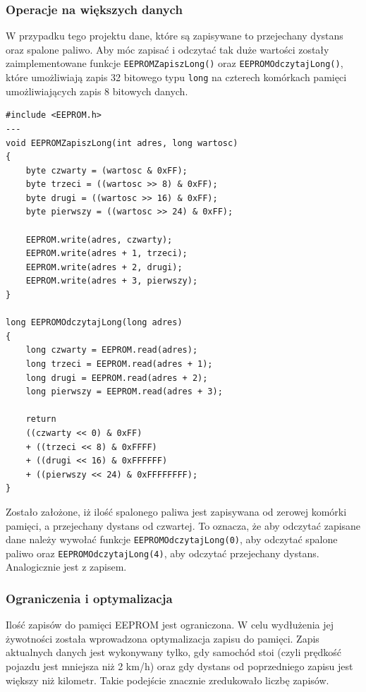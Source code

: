 \subsubsection{Operacje na większych danych}
W przypadku tego projektu dane, które są zapisywane to przejechany dystans oraz spalone paliwo. Aby móc zapisać i odczytać tak duże wartości zostały zaimplementowane funkcje \texttt{EEPROMZapiszLong()} oraz \texttt{EEPROMOdczytajLong()}, które umożliwiają zapis 32 bitowego typu \texttt{long} na czterech komórkach pamięci umożliwiających zapis 8 bitowych danych.

\begin{lstlisting}[label=list:eeprom_long,caption=Zapis i odczyt dużych liczb do/z EEPROM,
basicstyle=\footnotesize\ttfamily]
#include <EEPROM.h>
---
void EEPROMZapiszLong(int adres, long wartosc)
{
    byte czwarty = (wartosc & 0xFF);
    byte trzeci = ((wartosc >> 8) & 0xFF);
    byte drugi = ((wartosc >> 16) & 0xFF);
    byte pierwszy = ((wartosc >> 24) & 0xFF);
    
    EEPROM.write(adres, czwarty);
    EEPROM.write(adres + 1, trzeci);
    EEPROM.write(adres + 2, drugi);
    EEPROM.write(adres + 3, pierwszy);
}

long EEPROMOdczytajLong(long adres)
{
    long czwarty = EEPROM.read(adres);
    long trzeci = EEPROM.read(adres + 1);
    long drugi = EEPROM.read(adres + 2);
    long pierwszy = EEPROM.read(adres + 3);
    
    return 
    ((czwarty << 0) & 0xFF)
    + ((trzeci << 8) & 0xFFFF)
    + ((drugi << 16) & 0xFFFFFF) 
    + ((pierwszy << 24) & 0xFFFFFFFF);
}
\end{lstlisting}

Zostało założone, iż ilość spalonego paliwa jest zapisywana od zerowej komórki pamięci, a przejechany dystans od czwartej. To oznacza, że aby odczytać zapisane dane należy wywołać funkcje \texttt{EEPROMOdczytajLong(0)}, aby odczytać spalone paliwo oraz \texttt{EEPROMOdczytajLong(4)}, aby odczytać przejechany dystans. Analogicznie jest z zapisem.

\subsubsection{Ograniczenia i optymalizacja}

Ilość zapisów do pamięci EEPROM jest ograniczona. W celu wydłużenia jej żywotności została wprowadzona optymalizacja zapisu do pamięci. Zapis aktualnych danych jest wykonywany tylko, gdy samochód stoi (czyli prędkość pojazdu jest mniejsza niż 2 km/h) oraz gdy dystans od poprzedniego zapisu jest większy niż kilometr. Takie podejście znacznie zredukowało liczbę zapisów.